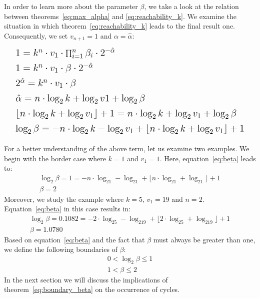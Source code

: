 \documentclass{SciPress_2015}
\renewcommand{\large}{\fontsize{14}{18pt}\selectfont}
\begin{document}
\par\medskip
In order to learn more about the parameter $\beta$, we take a look at the relation between theorems~\ref{eq:max_alpha} and \ref{eq:reachability_k}. We examine the situation in which theorem~\ref{eq:reachability_k} leads to the final result one. Consequently, we set $v_{n+1}=1$ and $\alpha=\hat\alpha$:
\begin{equation}
\label{eq:beta}
\large\def\arraystretch{1.2}\begin{array}{l}
	1=k^n\cdot v_1\cdot\prod_{i=1}^{n}\beta_i\cdot2^{-\hat\alpha}\\
	1=k^n\cdot v_1\cdot\beta\cdot2^{-\hat\alpha}\\
	2^{\hat\alpha}=k^n\cdot v_1\cdot\beta\\
	\hat\alpha=n\cdot\log_2k+\log_2v1+\log_2\beta\\
	\lfloor n\cdot\log_2k+\log_2v_1\rfloor+1=n\cdot\log_2k+\log_2v_1+\log_2\beta\\
	\log_2\beta=-n\cdot\log_2k-\log_2v_1+\lfloor n\cdot\log_2k+\log_2v_1\rfloor+1
\end{array}
\end{equation}

For a better understanding of the above term, let us examine two examples. We begin with the border case where $k=1$ and $v_1=1$. Here, equation~\ref{eq:beta} leads to:
\[
\begin{array}{c}
\log_2\beta=1=-n\cdot\log_21-\log_21+\lfloor n\cdot\log_21+\log_21\rfloor+1\\
\beta=2
\end{array}
\]
Moreover, we study the example where $k=5$, $v_1=19$ and $n=2$. Equation~\ref{eq:beta} in this case results in:
\[
\begin{array}{c}
\log_2\beta=0.1082=-2\cdot\log_25-\log_219+\lfloor 2\cdot\log_25+\log_219\rfloor+1\\
\beta=1.0780
\end{array}
\]
Based on equation~\ref{eq:beta} and the fact that $\beta$ must always be greater than one, we define the following boundaries of $\beta$:
\begin{equation}
\label{eq:boundary_beta}
\begin{array}{c}
0<\log_2\beta\le1\\
1<\beta\le2
\end{array}
\end{equation}
In the next section we will discuss the implications of theorem~\ref{eq:boundary_beta} on the occurrence of cycles.
\end{document}
